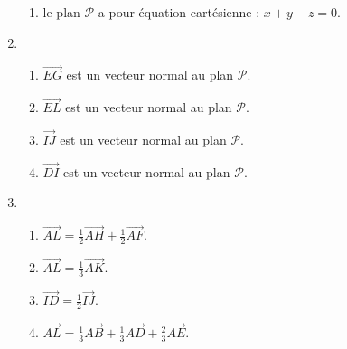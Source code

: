 \begin{enumerate}
\begin{enumerate}
          \item
     le plan $\mathscr P$ a pour équation cartésienne : $x+y-z=0$.\end{enumerate}
     \item
     \begin{enumerate}
          \item
          $\overrightarrow{EG}$ est un vecteur normal au plan $\mathscr P$.
          \item
          $\overrightarrow{EL}$ est un vecteur normal au plan $\mathscr P$.
          \item
          $\overrightarrow{IJ}$ est un vecteur normal au plan $\mathscr P$.
          \item
     $\overrightarrow{DI}$ est un vecteur normal au plan $\mathscr P$.\end{enumerate}
     \item
     \begin{enumerate}
          \item
          $\overrightarrow{AL}=\frac{1}{2}\overrightarrow{AH}+\frac{1}{2}\overrightarrow{AF}$.
          \item
          $\overrightarrow{AL}=\frac{1}{3}\overrightarrow{AK}$.
          \item
          $\overrightarrow{ID}=\frac{1}{2}\overrightarrow{IJ}$.
          \item
     $\overrightarrow{AL}=\frac{1}{3}\overrightarrow{AB}+\frac{1}{3}\overrightarrow{AD}+\frac{2}{3} \overrightarrow{AE}$.\end{enumerate}
\end{enumerate}
